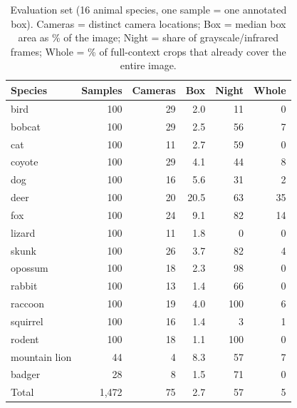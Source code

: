 \begin{table}[t]
\caption{Evaluation set (16 animal species, one sample = one annotated box). Cameras = distinct camera locations; Box = median box area as \% of the image; Night = share of grayscale/infrared frames; Whole = \% of full-context crops that already cover the entire image.}
\label{tab:dataset}
\centering\footnotesize
\setlength{\tabcolsep}{4pt}
\begin{tabular}{lrrrrr}
\toprule
Species & Samples & Cameras & Box & Night & Whole \\
\midrule
bird & 100 & 29 & 2.0 & 11 & 0 \\
bobcat & 100 & 29 & 2.5 & 56 & 7 \\
cat & 100 & 11 & 2.7 & 59 & 0 \\
coyote & 100 & 29 & 4.1 & 44 & 8 \\
dog & 100 & 16 & 5.6 & 31 & 2 \\
deer & 100 & 20 & 20.5 & 63 & 35 \\
fox & 100 & 24 & 9.1 & 82 & 14 \\
lizard & 100 & 11 & 1.8 & 0 & 0 \\
skunk & 100 & 26 & 3.7 & 82 & 4 \\
opossum & 100 & 18 & 2.3 & 98 & 0 \\
rabbit & 100 & 13 & 1.4 & 66 & 0 \\
raccoon & 100 & 19 & 4.0 & 100 & 6 \\
squirrel & 100 & 16 & 1.4 & 3 & 1 \\
rodent & 100 & 18 & 1.1 & 100 & 0 \\
mountain lion & 44 & 4 & 8.3 & 57 & 7 \\
badger & 28 & 8 & 1.5 & 71 & 0 \\
\midrule
Total & 1,472 & 75 & 2.7 & 57 & 5 \\
\bottomrule
\end{tabular}
\end{table}
